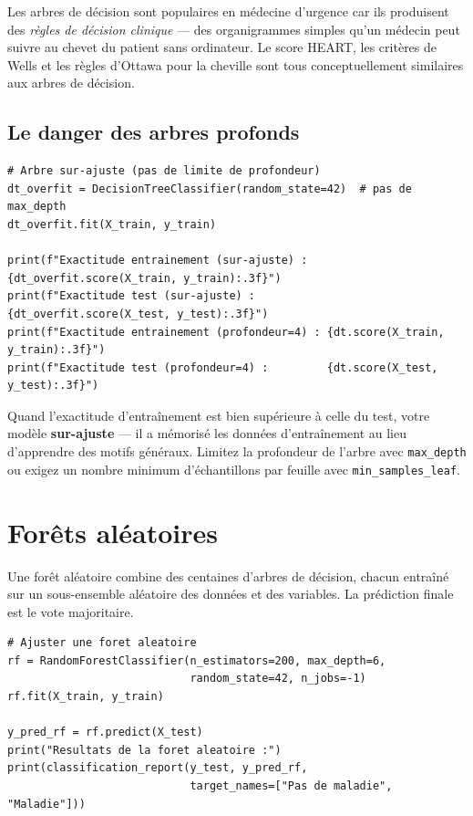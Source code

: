 \begin{clinicalnote}
Les arbres de d\'ecision sont populaires en m\'edecine d'urgence car ils produisent des \emph{r\`egles de d\'ecision clinique} --- des organigrammes simples qu'un m\'edecin peut suivre au chevet du patient sans ordinateur. Le score HEART, les crit\`eres de Wells et les r\`egles d'Ottawa pour la cheville sont tous conceptuellement similaires aux arbres de d\'ecision.
\end{clinicalnote}

\subsection{Le danger des arbres profonds}

\begin{verbatim}
# Arbre sur-ajuste (pas de limite de profondeur)
dt_overfit = DecisionTreeClassifier(random_state=42)  # pas de max_depth
dt_overfit.fit(X_train, y_train)

print(f"Exactitude entrainement (sur-ajuste) : {dt_overfit.score(X_train, y_train):.3f}")
print(f"Exactitude test (sur-ajuste) :         {dt_overfit.score(X_test, y_test):.3f}")
print(f"Exactitude entrainement (profondeur=4) : {dt.score(X_train, y_train):.3f}")
print(f"Exactitude test (profondeur=4) :         {dt.score(X_test, y_test):.3f}")
\end{verbatim}

\begin{pythontip}
Quand l'exactitude d'entra\^inement est bien sup\'erieure \`a celle du test, votre mod\`ele \textbf{sur-ajuste} --- il a m\'emoris\'e les donn\'ees d'entra\^inement au lieu d'apprendre des motifs g\'en\'eraux. Limitez la profondeur de l'arbre avec \texttt{max\_depth} ou exigez un nombre minimum d'\'echantillons par feuille avec \texttt{min\_samples\_leaf}.
\end{pythontip}

\section{For\^ets al\'eatoires}

Une for\^et al\'eatoire combine des centaines d'arbres de d\'ecision, chacun entra\^in\'e sur un sous-ensemble al\'eatoire des donn\'ees et des variables. La pr\'ediction finale est le vote majoritaire.

\begin{verbatim}
# Ajuster une foret aleatoire
rf = RandomForestClassifier(n_estimators=200, max_depth=6,
                            random_state=42, n_jobs=-1)
rf.fit(X_train, y_train)

y_pred_rf = rf.predict(X_test)
print("Resultats de la foret aleatoire :")
print(classification_report(y_test, y_pred_rf,
                            target_names=["Pas de maladie", "Maladie"]))
\end{verbatim}


